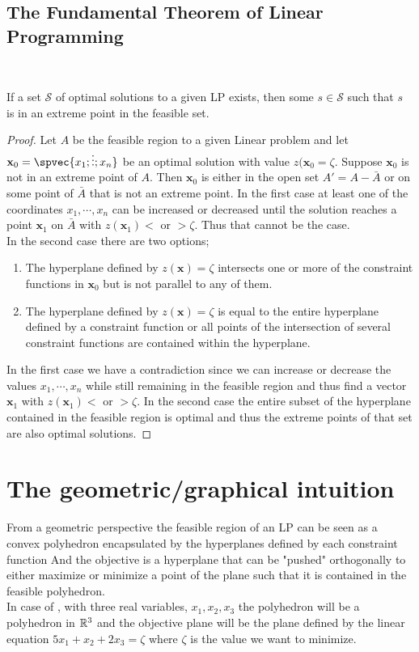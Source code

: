 \subsection{The Fundamental Theorem of Linear Programming}
~\cite[Theorem 3.4]{vanderbei2015linear}
\begin{theorem}\label{extreme point}
If a set $\mathcal{S}$ of optimal solutions to a given LP exists, then some $s\in \mathcal{S}$ such that $s$ is in an extreme point in the feasible set.
\begin{proof}
Let $A$ be the feasible region to a given Linear problem and let $\textbf{x}_0=\spvec{x_1;\vdots;x_n}$ be an optimal solution with value $z(\textbf{x}_0=\zeta$.
Suppose $\textbf{x}_0$ is not in an extreme point of $A$. Then $\textbf{x}_0$ is either in the open set $A'=A-\bar{A}$ or on some point of $\bar{A}$ that is not an extreme point. In the first case at least one of the coordinates $x_1,\cdots, x_n$ can be increased or decreased until the solution reaches a point $\textbf{x}_1$ on $\bar{A}$ with $z(\textbf{x}_1)< \text{ or } > \zeta$. Thus that cannot be the case.\\
In the second case there are two options;
\begin{enumerate}
\item The hyperplane defined by $z(\textbf{x}) = \zeta$ intersects one or more of the constraint functions in $\textbf{x}_0$ but is not parallel to any of them.
\item The hyperplane defined by $z(\textbf{x}) = \zeta$ is equal to the entire hyperplane defined by a constraint function or all points of the intersection of several constraint functions are contained within the hyperplane.
\end{enumerate}
In the first case we have a contradiction since we can increase or decrease the values $x_1,\cdots, x_n$ while still remaining in the feasible region and thus find a vector $\textbf{x}_1$ with $z(\textbf{x}_1)< \text{ or } > \zeta$. In the second case the entire subset of the hyperplane contained in the feasible region is optimal and thus the extreme points of that set are also optimal solutions.
\end{proof}
\end{theorem}
\section{The geometric/graphical intuition}
From a geometric perspective the feasible region of an LP can be seen as a convex polyhedron encapsulated by the hyperplanes defined by each constraint function And the objective is a hyperplane that can be "pushed" orthogonally to either maximize or minimize a point of the plane such that it is contained in the feasible polyhedron.\\ 
In case of , with three real variables, $x_1,x_2,x_3$ the polyhedron will be a polyhedron in $\mathbb{R}^3$ and the objective plane will be the plane defined by the linear equation $5x_1+x_2+2x_3 = \zeta $ where $\zeta $ is the value we want to minimize. 
